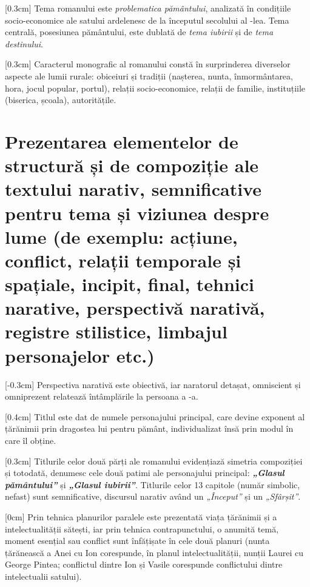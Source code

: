 \documentclass[
12pt,
a4paper
]{article}
\newcommand{\rom}[1]{\uppercase\expandafter{\romannumeral #1\relax}} %
\begin{document}
[0.3cm]
Tema romanului este \textit{problematica pământului}, analizată în condițiile socio-e\-co\-no\-mi\-ce ale satului ardelenesc de la începutul secolului al \rom{20}-lea. Tema centrală, posesiunea pământului, este dublată de \textit{tema iubirii} și de \textit{tema destinului}.

[0.3cm]
Caracterul monografic al romanului constă în surprinderea diverselor aspecte ale lumii rurale: obiceiuri și tradiții (nașterea, nunta, înmormântarea, hora, jocul popular, portul), relații socio-economice, relații de familie, instituțiile (biserica, școala), autoritățile.

\section{Prezentarea elementelor de structură și de compoziție ale textului narativ, semnificative pentru tema și viziunea despre lume {\footnotesize (de exemplu: acțiune, conflict, relații temporale și spațiale, incipit, final, tehnici narative, perspectivă narativă, registre stilistice, limbajul personajelor etc.)}}

[-0.3cm]
Perspectiva narativă este obiectivă, iar naratorul detașat, omniscient și omniprezent relatează întâmplările la persoana a \rom{3}-a.

[0.4cm]
Titlul este dat de numele personajului principal, care devine exponent al țărănimii prin dragostea lui pentru pământ, individualizat însă prin modul în care îl obține.

[0.3cm]
Titlurile celor două părți ale romanului evidențiază simetria compoziției și totodată, denumesc cele două patimi ale personajului principal: \textbf{\textit{„Glasul pământului”}} și \textbf{\textit{„Glasul iubirii”}}. Titlurile celor 13 capitole (număr simbolic, nefast) sunt semnificative, discursul narativ având un \textit{„Început”} și un \textit{„Sfârșit”}.

[0cm]
Prin tehnica planurilor paralele este prezentată viața țărănimii și a intelectualității sătești, iar prin tehnica contrapunctului, o anumită temă, moment esențial sau conflict sunt înfățișate în cele două planuri (nunta țărănească a Anei cu Ion corespunde, în planul intelectualității, nunții Laurei cu George Pintea;
conflictul dintre Ion și Vasile corespunde conflictului dintre intelectualii satului).
\end{document}
